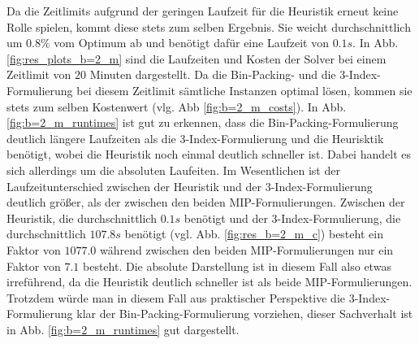 Da die Zeitlimits aufgrund der geringen Laufzeit für die Heuristik erneut keine Rolle spielen,
kommt diese stets zum selben Ergebnis. Sie weicht durchschnittlich um $0.8 \%$ vom
Optimum ab und benötigt dafür eine Laufzeit von $0.1s$. In Abb. \ref{fig:res_plots_b=2_m} sind die Laufzeiten und
Kosten der Solver bei einem Zeitlimit von $20$ Minuten dargestellt. Da die Bin-Packing- und die 3-Index-Formulierung
bei diesem Zeitlimit sämtliche Instanzen optimal lösen, kommen sie stets zum selben Kostenwert (vlg. Abb \ref{fig:b=2_m_costs}).
In Abb. \ref{fig:b=2_m_runtimes} ist gut zu erkennen, dass die Bin-Packing-Formulierung deutlich längere Laufzeiten als die 3-Index-Formulierung
und die Heurisktik benötigt, wobei die Heuristik noch einmal deutlich schneller ist. Dabei handelt es sich allerdings um die absoluten Laufeiten.
Im Wesentlichen ist der Laufzeitunterschied zwischen der Heuristik und der 3-Index-Formulierung deutlich größer, als der zwischen den beiden
MIP-Formulierungen. Zwischen der Heuristik, die durchschnittlich $0.1s$ benötigt und der 3-Index-Formulierung, die durchschnittlich $107.8s$ benötigt (vgl. Abb. \ref{fig:res_b=2_m_c}) besteht ein Faktor von $1077.0$ während zwischen den beiden MIP-Formulierungen nur ein Faktor von
$7.1$ besteht. Die absolute Darstellung ist in diesem Fall also etwas irreführend, da die Heuristik deutlich schneller ist als beide MIP-Formulierungen. Trotzdem würde man in diesem Fall aus praktischer Perspektive die 3-Index-Formulierung klar der Bin-Packing-Formulierung vorziehen, dieser Sachverhalt ist in Abb. \ref{fig:b=2_m_runtimes} gut dargestellt.

